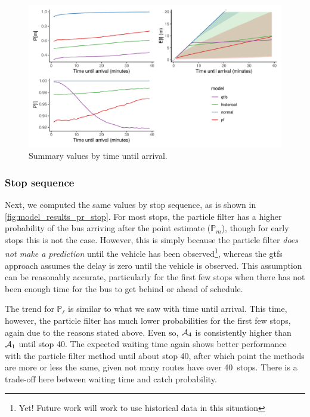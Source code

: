 \begin{knitrout}\small
{}\color{fgcolor}\begin{figure}
\includegraphics[width=\textwidth]{figure/model_results_pr_time-1} \caption[Summary values by time until arrival]{Summary values by time until arrival.}\label{fig:model_results_pr_time}
\end{figure}


\end{knitrout}


\subsubsection{Stop sequence}

Next, we computed the same values by stop sequence, as is shown in \cref{fig:model_results_pr_stop}. For most stops, the particle filter has a higher probability of the bus arriving after the point estimate ($\mathbb{P}_m$), though for early stops this is not the case. However, this is simply because the particle filter \emph{does not make a prediction} until the vehicle has been observed\footnote{Yet! Future work will work to use historical data in this situation}, whereas the \gls{gtfs} approach assumes the delay is zero until the vehicle is observed. This assumption can be reasonably accurate, particularly for the first few stops when there has not been enough time for the bus to get behind or ahead of schedule.

The trend for $\mathbb{P}_\ell$ is similar to what we saw with time until arrival. This time, however, the particle filter has much lower probabilities for the first few stops, again due to the reasons stated above. Even so, $\mathcal{A}_4$ is consistently higher than $\mathcal{A}_1$ until stop 40. The expected waiting time again shows better performance with the particle filter method until about stop 40, after which point the methods are more or less the same, given not many routes have over 40~stops. There is a trade-off here between waiting time and catch probability.


